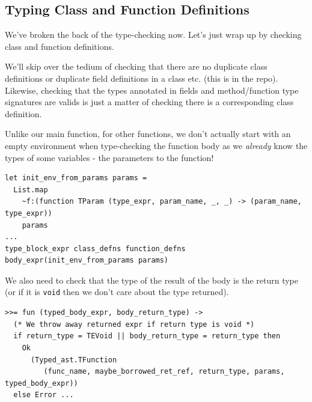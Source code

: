 {{\hypertarget{typing-class-and-function-definitions}{%
\subsection{\texorpdfstring{\protect\hyperlink{typing-class-and-function-definitions}{}Typing
Class and Function
Definitions}{Typing Class and Function Definitions}}\label{typing-class-and-function-definitions}}

We've broken the back of the type-checking now. Let's just wrap up by
checking class and function definitions.

We'll skip over the tedium of checking that there are no duplicate class
definitions or duplicate field definitions in a class etc. (this is in
the repo). Likewise, checking that the types annotated in fields and
method/function type signatures are valids is just a matter of checking
there is a corresponding class definition.

Unlike our main function, for other functions, we don't actually start
with an empty environment when type-checking the function body as we
\emph{already} know the types of some variables - the parameters to the
function!

\begin{lstlisting}[caption={caption text},language=caml]
let init_env_from_params params =
  List.map
    ~f:(function TParam (type_expr, param_name, _, _) -> (param_name, type_expr))
    params
...
type_block_expr class_defns function_defns body_expr(init_env_from_params params)
\end{lstlisting}


We also need to check that the type of the result of the body is the
return type (or if it is \texttt{void} then we don't care about the type
returned).

\begin{lstlisting}[language=caml]
>>= fun (typed_body_expr, body_return_type) ->
  (* We throw away returned expr if return type is void *)
  if return_type = TEVoid || body_return_type = return_type then
    Ok
      (Typed_ast.TFunction
         (func_name, maybe_borrowed_ret_ref, return_type, params, typed_body_expr))
  else Error ...
\end{lstlisting}

}}
